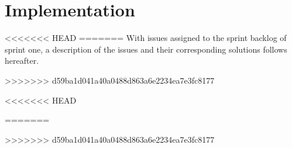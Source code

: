 \section{Implementation}
<<<<<<< HEAD
=======
With issues assigned to the sprint backlog of sprint one, a description of the issues and their corresponding solutions follows hereafter.


>>>>>>> d59ba1d041a40a0488d863a6e2234ea7e3fc8177



<<<<<<< HEAD


=======


>>>>>>> d59ba1d041a40a0488d863a6e2234ea7e3fc8177








